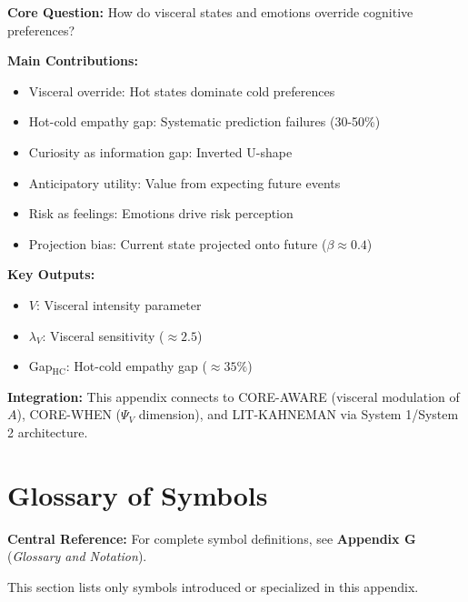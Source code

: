 \begin{tcolorbox}[colback=green!10!white, colframe=green!75!black,
    title=\textbf{Appendix LO: Summary}]

\textbf{Core Question:} How do visceral states and emotions override cognitive preferences?

\textbf{Main Contributions:}
\begin{itemize}[nosep]
    \item Visceral override: Hot states dominate cold preferences
    \item Hot-cold empathy gap: Systematic prediction failures (30-50\%)
    \item Curiosity as information gap: Inverted U-shape
    \item Anticipatory utility: Value from expecting future events
    \item Risk as feelings: Emotions drive risk perception
    \item Projection bias: Current state projected onto future ($\beta \approx 0.4$)
\end{itemize}

\textbf{Key Outputs:}
\begin{itemize}[nosep]
    \item $V$: Visceral intensity parameter
    \item $\lambda_V$: Visceral sensitivity ($\approx 2.5$)
    \item Gap$_{\text{HC}}$: Hot-cold empathy gap ($\approx 35\%$)
\end{itemize}

\textbf{Integration:} This appendix connects to CORE-AWARE (visceral modulation of $A$),
CORE-WHEN ($\Psi_V$ dimension), and LIT-KAHNEMAN via System 1/System 2 architecture.

\end{tcolorbox}


\section{Glossary of Symbols}
\label{sec:lo-glossary}

\begin{tcolorbox}[colback=blue!5!white, colframe=blue!75!black]
\textbf{Central Reference:} For complete symbol definitions, see
\textbf{Appendix G} (\textit{Glossary and Notation}).

This section lists only symbols introduced or specialized in this appendix.
\end{tcolorbox}

